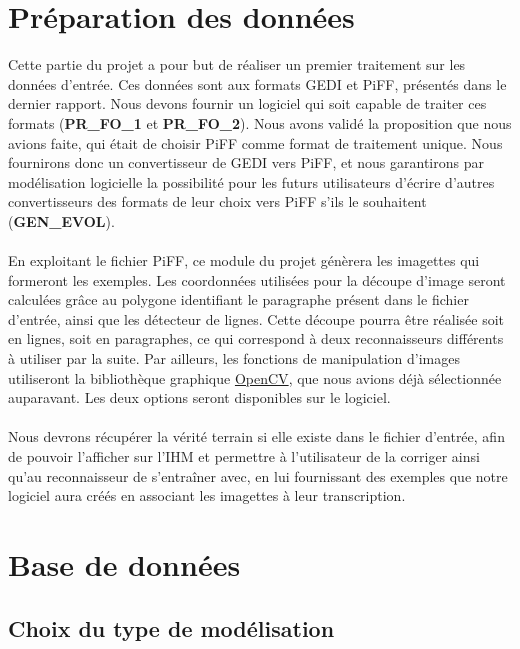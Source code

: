 \section{Préparation des données}

Cette partie du projet a pour but de réaliser un premier traitement sur les
données d’entrée. Ces données sont aux formats GEDI et PiFF, présentés dans
le dernier rapport. Nous devons fournir un logiciel qui soit capable de
traiter ces formats (\textbf{PR\_FO\_1} et \textbf{PR\_FO\_2}). Nous avons validé
la proposition que nous avions faite, qui était de choisir PiFF comme format
de traitement unique. Nous fournirons donc un convertisseur de GEDI vers PiFF,
et nous garantirons par modélisation logicielle la possibilité pour les futurs
utilisateurs d’écrire d’autres convertisseurs des formats de leur choix vers
PiFF s’ils le souhaitent (\textbf{GEN\_EVOL}).

\paragraph{}
En exploitant le fichier PiFF, ce module du projet génèrera les imagettes qui
formeront les exemples. Les coordonnées utilisées pour la découpe d’image seront
calculées grâce au polygone identifiant le paragraphe présent dans le fichier
d’entrée, ainsi que les détecteur de lignes. Cette découpe pourra être réalisée
soit en lignes, soit en paragraphes, ce qui correspond à deux reconnaisseurs
différents à utiliser par la suite. Par ailleurs, les fonctions de manipulation
d’images utiliseront la bibliothèque graphique \href{https://opencv.org}{OpenCV},
que nous avions déjà sélectionnée auparavant. Les deux options seront
disponibles sur le logiciel.

\paragraph{}
Nous devrons récupérer la vérité terrain si elle existe dans le fichier d’entrée,
afin de pouvoir l’afficher sur l’IHM et permettre à l’utilisateur de la corriger
ainsi qu’au reconnaisseur de s’entraîner avec, en lui fournissant des exemples
que notre logiciel aura créés en associant les imagettes à leur transcription.

\section{Base de données}

\subsection{Choix du type de modélisation}

